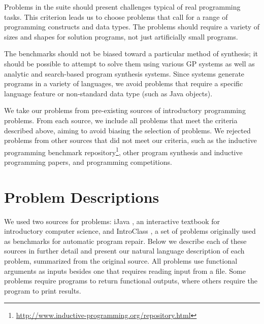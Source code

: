 \documentclass{sig-alternate}
\begin{document}
Problems in the suite should present challenges typical of real programming tasks. 
This criterion leads us to choose problems that call for a range of programming constructs and data types. The problems should require a variety of sizes and shapes for solution programs, not just artificially small programs. 

The benchmarks should not be biased toward a particular method of synthesis; it should be possible to attempt to solve them using various GP systems as well as analytic and search-based program synthesis systems. Since systems generate programs in a variety of languages, we avoid problems that require a specific language feature or non-standard data type (such as Java objects).

We take our problems from pre-existing sources of introductory programming problems. From each source, we include all problems that meet the criteria described above, aiming to avoid biasing the selection of problems. We rejected problems from other sources that did not meet our criteria, such as the inductive programming benchmark repository\footnote{\url{http://www.inductive-programming.org/repository.html}}, other program synthesis and inductive programming papers, and programming competitions.



\section{Problem Descriptions} \label{descriptionsSection}

We used two sources for problems: iJava \cite{iJava}, an interactive textbook for introductory computer science, and IntroClass \cite{ManyBugsAndIntroClass, Brun13TRgptest}, a set of problems originally used as benchmarks for automatic program repair. Below we describe each of these sources in further detail and present our natural language description of each problem, summarized from the original source. All problems use functional arguments as inputs besides one that requires reading input from a file. Some problems require programs to return functional outputs, where others require the program to print results.
\end{document}
